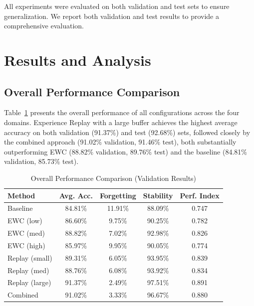 \documentclass[conference]{IEEEtran}
\begin{document}
All experiments were evaluated on both validation and test sets to ensure generalization. We report both validation and test results to provide a comprehensive evaluation.

\section{Results and Analysis}
\subsection{Overall Performance Comparison}
Table~\ref{tab:overall_results} presents the overall performance of all configurations across the four domains. Experience Replay with a large buffer achieves the highest average accuracy on both validation (91.37\%) and test (92.68\%) sets, followed closely by the combined approach (91.02\% validation, 91.46\% test), both substantially outperforming EWC (88.82\% validation, 89.76\% test) and the baseline (84.81\% validation, 85.73\% test).

\begin{table}[h]
\caption{Overall Performance Comparison (Validation Results)}
\label{tab:overall_results}
\centering
\begin{tabular}{lcccc}
\hline
\textbf{Method} & \textbf{Avg. Acc.} & \textbf{Forgetting} & \textbf{Stability} & \textbf{Perf. Index} \\
\hline
Baseline & 84.81\% & 11.91\% & 88.09\% & 0.747 \\
EWC (low) & 86.60\% & 9.75\% & 90.25\% & 0.782 \\
EWC (med) & 88.82\% & 7.02\% & 92.98\% & 0.826 \\
EWC (high) & 85.97\% & 9.95\% & 90.05\% & 0.774 \\
Replay (small) & 89.31\% & 6.05\% & 93.95\% & 0.839 \\
Replay (med) & 88.76\% & 6.08\% & 93.92\% & 0.834 \\
Replay (large) & 91.37\% & 2.49\% & 97.51\% & 0.891 \\
Combined & 91.02\% & 3.33\% & 96.67\% & 0.880 \\
\hline
\end{tabular}
\end{table}
\end{document}

